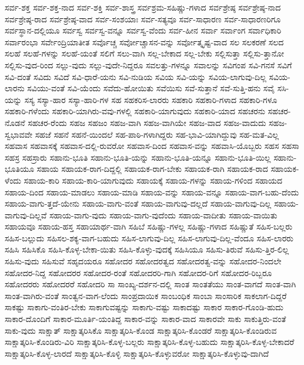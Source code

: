 {ಸರ್ವ-ಶಕ್ತ
ಸರ್ವ-ಶಕ್ತ-ನಾದ
ಸರ್ವ-ಶಕ್ತಿ
ಸರ್ವ-ಶಾಸ್ತ್ರ
ಸರ್ವಶ್ರಮ-ಸಹಿಷ್ಣು-ಗಳಾದ
ಸರ್ವಶ್ರೇಷ್ಠ
ಸರ್ವಶ್ರೇಷ್ಠ-ನಾದ
ಸರ್ವಶ್ರೇಷ್ಠ-ರಾದ
ಸರ್ವಶ್ರೇಷ್ಠ-ವಾದ
ಸರ್ವ-ಸಂಶಯಾಃ
ಸರ್ವ-ಸತ್ಯವೂ
ಸರ್ವ-ಸಾಧಾರಣ
ಸರ್ವ-ಸಾಧಾರಣರಿಗೂ
ಸರ್ವಸ್ಥಾನ-ದಲ್ಲಿಯೂ
ಸರ್ವಸ್ವ
ಸರ್ವಸ್ವ-ವನ್ನೂ
ಸರ್ವಸ್ವ-ವೆಂದು
ಸರ್ವ-ಹೀನ
ಸರ್ವಾ
ಸರ್ವಾಂಗ
ಸರ್ವಾಧಿಕಾರಿ
ಸರ್ವಾರಂಭಾ
ಸರ್ವೇಂದ್ರಿಯಾತೀತ
ಸರ್ವೊಚ್ಚ
ಸರ್ವೋಚ್ಚಾಸನ-ವನ್ನು
ಸರ್ವೋತ್ಕೃಷ್ಟ-ವಾದ
ಸಲ
ಸಲಕರಣೆ
ಸಲದ
ಸಲಹೆ
ಸಲಹೆ-ಗಳನ್ನು
ಸಲಹೆ-ಯಂತೆ
ಸಲಿಗೆ
ಸಲು-ವಾಗಿ
ಸಲ್ಲ-ಬೇಕಾದ
ಸಲ್ಲ-ಬೇಕು
ಸಲ್ಲಿಸುತ್ತಾ
ಸಲ್ಲಿಸು-ತ್ತಾನೋ
ಸಲ್ಲಿಸು-ವುದ-ರಿಂದ
ಸಲ್ಲು-ವುದು
ಸಲ್ಲು-ವುದೇ-ನಿದ್ದರೂ
ಸವಲತ್ತು-ಗಳನ್ನೂ
ಸವಾಲನ್ನು
ಸವಿಗಂಪ
ಸವಿ-ಗನಸೆ
ಸವಿಗೆ
ಸವಿ-ದಂತೆ
ಸವಿದು
ಸವಿದೆ
ಸವಿ-ಧಾರೆ-ಯನು
ಸವಿ-ನುಡಿಯ
ಸವಿಯ
ಸವಿ-ಯನ್ನು
ಸವಿಯ-ಲಾಗುವು-ದಿಲ್ಲ
ಸವಿಯ-ಲಾರನು
ಸವಿಯು-ವಂತೆ
ಸವಿ-ಯೆಂದು
ಸವೆದು-ಹೋಯಿತು
ಸವೆಯಿಸು
ಸವೆ-ಸುತ್ತಾನೆ
ಸವೆ-ಸುತ್ತಿ-ಹನು
ಸವೈ
ಸಸಿ-ಯನ್ನು
ಸಸ್ಯ
ಸಸ್ಯಾ-ಹಾರ
ಸಸ್ಯಾ-ಹಾರಿ-ಗಳ
ಸಹ
ಸಹಕರಿಸ-ಲಾರರು
ಸಹಕಾರಿ
ಸಹಕಾರಿ-ಗಳಾದ
ಸಹಕಾರಿ-ಗಳೂ
ಸಹಕಾರಿ-ಗಳೆಂದು
ಸಹಕಾರಿ-ಯಾಗಿರು-ವವು-ಗಳಲ್ಲಿ
ಸಹಕಾರಿ-ಯಾಗುವುದು
ಸಹಕಾರಿ-ಯಾದ
ಸಹಚರನು
ಸಹಚರ-ನೊಡನೆ
ಸಹಚರ-ರೆಂದು
ಸಹಜ
ಸಹಜಂ
ಸಹಜ-ವಾಗಿ
ಸಹಜ-ವಾಗಿಯೇ
ಸಹಜ-ವಾದ
ಸಹಜ-ವಾದುದು
ಸಹಜ-ಸ್ವಭಾವವೇ
ಸಹಜೆ
ಸಹನೆ
ಸಹನೆ-ಯಿಂದಲೆ
ಸಹ-ಪಾಠಿ-ಗಳಾಗಿದ್ದರು
ಸಹ-ಭಾವಿ-ಯಾಗಿದ್ದುವು
ಸಹ-ಮತ-ವಿಲ್ಲ
ಸಹವಾಸ
ಸಹವಾಸಕ್ಕೆ
ಸಹವಾಸ-ದಲ್ಲಿ-ರುವರೋ
ಸಹವಾಸ-ದಿಂದ
ಸಹವಾಸ-ವನ್ನು
ಸಹವಾಸಿ-ಯೊಬ್ಬರು
ಸಹಸ
ಸಹಸಾ
ಸಹಸ್ರ
ಸಹಸ್ರಾರು
ಸಹಾನು-ಭೂತಿ
ಸಹಾನು-ಭೂತಿ-ಯನ್ನು
ಸಹಾನು-ಭೂತಿ-ಯನ್ನೂ
ಸಹಾನು-ಭೂತಿ-ಯಿಲ್ಲ
ಸಹಾನು-ಭೂತಿಯೂ
ಸಹಾಯ
ಸಹಾಯಕ-ರಾಗ-ದಿದ್ದಲ್ಲಿ
ಸಹಾಯಕ-ರಾಗ-ಬೇಕು
ಸಹಾಯಕ-ರಾಗಿ
ಸಹಾಯಕ-ರಾದ
ಸಹಾಯಕ-ಳೆಂದು
ಸಹಾಯ-ಕಾರಿ
ಸಹಾಯ-ಕಾರಿ-ಯಾಗುವುದು
ಸಹಾಯಕ್ಕೆ
ಸಹಾಯ-ಗಳನ್ನು
ಸಹಾಯ-ಗಳಿಂದ
ಸಹಾಯದ
ಸಹಾಯ-ದಿಂದ
ಸಹಾಯ-ಮಾಡಲು
ಸಹಾಯ-ಮಾಡಿ
ಸಹಾಯ-ವನ್ನು
ಸಹಾಯ-ವನ್ನೂ
ಸಹಾಯ-ವಾಗ-ಬಹು-ದೆಂದು
ಸಹಾಯ-ವಾಗು-ತ್ತದೆ-ಯೇನು
ಸಹಾಯ-ವಾಗು-ವಂತೆ
ಸಹಾಯ-ವಾಗುವು-ದಲ್ಲದೆ
ಸಹಾಯ-ವಾಗುವು-ದಿಲ್ಲ
ಸಹಾಯ-ವಾಗುವು-ದಿಲ್ಲವೆ
ಸಹಾಯ-ವಾಗು-ವುದು
ಸಹಾಯ-ವಾಗು-ವುದೆಂದು
ಸಹಾಯ-ವಾದೀತು
ಸಹಾಯ-ವಾಯಿತು
ಸಹಾಯವೂ
ಸಹಾಯ-ಹಸ್ತ
ಸಹಾಯಾರ್ಥ-ವಾಗಿ
ಸಹಿಬೆ
ಸಹಿಷ್ಣು-ಗಳಲ್ಲ
ಸಹಿಷ್ಣು-ಗಳಾದ
ಸಹಿಷ್ಣುತೆ
ಸಹಿಸ-ಬಲ್ಲರು
ಸಹಿಸ-ಬಲ್ಲುದು
ಸಹಿಸಲ-ಶಕ್ಯ-ವಾಗ-ಬಹುದು
ಸಹಿಸ-ಲಾಗುವು-ದಿಲ್ಲ
ಸಹಿಸ-ಲಾಗುವು-ದಿಲ್ಲ-ವೆಂದೂ
ಸಹಿಸ-ಲಾರರು
ಸಹಿಸಿ
ಸಹಿಸಿಕೊ
ಸಹಿಸಿ-ಕೊಳ್ಳ-ಬೇಕಾ-ಯಿತು
ಸಹಿಸಿ-ಕೊಳ್ಳು-ವುದಕ್ಕೆ
ಸಹಿಸಿಯೂ
ಸಹಿಸು-ತಿರುವೆ
ಸಹಿಸು-ತ್ತಿರ-ಲಿಲ್ಲ
ಸಹಿಸು-ವುದು
ಸಹಿಸುವೆ
ಸಹೃದಯರೂ
ಸಹೋದರ
ಸಹೋದರತ್ವದ
ಸಹೋದರತ್ವ-ವನ್ನು
ಸಹೋದರ-ನಿಂದಲೇ
ಸಹೋದರ-ನಿದ್ದ
ಸಹೋದರರ
ಸಹೋದರ-ರಂತೆ
ಸಹೋದರರಿ-ಗಾಗಿ
ಸಹೋದರ-ರಿಗೆ
ಸಹೋದರ-ರಿಬ್ಬರೂ
ಸಹೋದರರು
ಸಹೋದರರೆ
ಸಹೋದರಿ
ಸಾ
ಸಾಂಖ್ಯ-ದರ್ಶನ-ದಲ್ಲಿ
ಸಾಂತ
ಸಾಂತತೆಯು
ಸಾಂತ-ವಾಗದೆ
ಸಾಂತ-ವಾಗಿ
ಸಾಂತ-ವಾಗಿರು-ವಂತೆ
ಸಾಂತ್ವನ-ವಾಗ-ಲೆಂದು
ಸಾಂಪ್ರದಾಯಿಕ
ಸಾಂಬಂಧಿಕ
ಸಾಂಬಾ
ಸಾಂಸಾರಿಕ
ಸಾಕಲಾಗ-ದಿದ್ದರೆ
ಸಾಕಷ್ಟು
ಸಾಕಾಗು-ವಂತಿರ-ಬೇಕು
ಸಾಕಾಗುವಷ್ಟನ್ನು
ಸಾಕಾಗು-ವಷ್ಟು
ಸಾಕಾದಷ್ಟು
ಸಾಕಾರ
ಸಾಕಾರ-ಗೊಂಡಿ-ಹುದು
ಸಾಕಾರ-ದೊಂದಿಗೆ
ಸಾಕಾರ-ಮೂರ್ತಿ-ಯಂತಿದ್ದ
ಸಾಕಾರ-ವನ್ನು
ಸಾಕಾರ-ವಾದ
ಸಾಕಾರವೇ
ಸಾಕು
ಸಾಕುತ್ತಿರು-ವಂತೆ
ಸಾಕು-ವುದು
ಸಾಕ್ಷಾತ್
ಸಾಕ್ಷಾತ್ಕರಿಸಿಕೊ
ಸಾಕ್ಷಾತ್ಕರಿಸಿ-ಕೊಂಡ
ಸಾಕ್ಷಾತ್ಕರಿಸಿ-ಕೊಂಡರೆ
ಸಾಕ್ಷಾತ್ಕರಿಸಿ-ಕೊಂಡಿರುವ
ಸಾಕ್ಷಾತ್ಕರಿಸಿ-ಕೊಂಡಿರು-ವಿರಿ
ಸಾಕ್ಷಾತ್ಕರಿಸಿ-ಕೊಳ್ಳ-ಬಲ್ಲರು
ಸಾಕ್ಷಾತ್ಕರಿಸಿ-ಕೊಳ್ಳ-ಬಹುದು
ಸಾಕ್ಷಾತ್ಕರಿಸಿ-ಕೊಳ್ಳ-ಬೇಕಾದರೆ
ಸಾಕ್ಷಾತ್ಕರಿಸಿ-ಕೊಳ್ಳ-ಲಾರದೆ
ಸಾಕ್ಷಾತ್ಕರಿಸಿ-ಕೊಳ್ಳಿ
ಸಾಕ್ಷಾತ್ಕರಿಸಿ-ಕೊಳ್ಳುವರೋ
ಸಾಕ್ಷಾತ್ಕರಿಸಿ-ಕೊಳ್ಳುವು-ದಾಗಿದೆ
}
